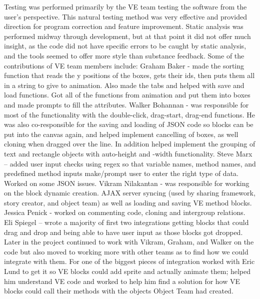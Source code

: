 \documentclass[a4paper]{article}
\begin{document}
Testing was performed primarily by the VE team testing the software from the user's perspective. This natural testing method was very effective and provided direction for program correction and feature improvement. Static analysis was performed midway through development, but at that point it did not offer much insight, as the code did not have specific errors to be caught by static analysis, and the tools seemed to offer more style than substance feedback.\newline \newline 
Some of the contributions of VE team members include: \newline \newline 
Graham Baker - made the sorting function that reads the y positions of the boxes, gets their ids, then puts them all in a string to give to animation. Also made the tabs and helped with save and load functions. Got all of the functions from animation and put them into boxes and made prompts to fill the attributes. \newline \newline 
Walker Bohannan - was responsible for most of the functionality with the double-click, drag-start, drag-end functions. He was also co-responsible for the saving and loading of JSON code so blocks can be put into the canvas again, and helped implement cancelling of boxes, as well cloning when dragged over the line. In addition helped implement the grouping of text and rectangle objects with auto-height and -width functionality. \newline \newline 
Steve Marx – added user input checks using regex so that variable names, method names, and predefined method inputs make/prompt user to enter the right type of data. Worked on some JSON issues. \newline \newline 
Vikram Nilakantan - was responsible for working on the block dynamic creation. AJAX server syncing (used by sharing framework, story creator, and object team) as well as loading and saving VE method blocks.\newline \newline 
Jessica Penick - worked on commenting code, cloning and intergroup relations.\newline \newline 
Eli Spiegel – wrote a majority of first two integrations getting blocks that could drag and drop and being able to have user input as those blocks got dropped. Later in the project continued to work with Vikram, Graham, and Walker on the code but also moved to working more with other teams as to find how we could integrate with them. For one of the biggest pieces of integration worked with Eric Lund to get it so VE blocks could add sprite and actually animate them; helped him understand VE code and worked to help him find a solution for how VE blocks could call their methods with the objects Object Team had created.\newline \newline 
\end{document}
